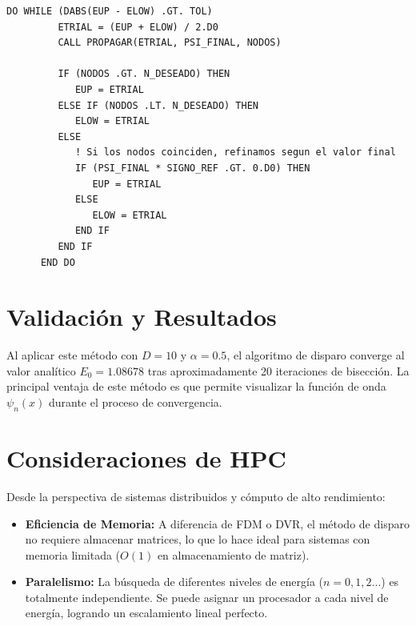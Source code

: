 \documentclass[12pt,a4paper]{article}
\begin{document}
\begin{lstlisting}[caption={Bucle de bisección para encontrar el autovalor E}]
      DO WHILE (DABS(EUP - ELOW) .GT. TOL)
         ETRIAL = (EUP + ELOW) / 2.D0
         CALL PROPAGAR(ETRIAL, PSI_FINAL, NODOS)
         
         IF (NODOS .GT. N_DESEADO) THEN
            EUP = ETRIAL
         ELSE IF (NODOS .LT. N_DESEADO) THEN
            ELOW = ETRIAL
         ELSE
            ! Si los nodos coinciden, refinamos segun el valor final
            IF (PSI_FINAL * SIGNO_REF .GT. 0.D0) THEN
               EUP = ETRIAL
            ELSE
               ELOW = ETRIAL
            END IF
         END IF
      END DO
\end{lstlisting}

\section{Validación y Resultados}
Al aplicar este método con $D=10$ y $\alpha=0.5$, el algoritmo de disparo converge al valor analítico $E_0 = 1.08678$ tras aproximadamente 20 iteraciones de bisección. La principal ventaja de este método es que permite visualizar la función de onda $\psi_n(x)$ durante el proceso de convergencia.

\section{Consideraciones de HPC}
Desde la perspectiva de sistemas distribuidos y cómputo de alto rendimiento:
\begin{itemize}
    \item \textbf{Eficiencia de Memoria:} A diferencia de FDM o DVR, el método de disparo no requiere almacenar matrices, lo que lo hace ideal para sistemas con memoria limitada ($O(1)$ en almacenamiento de matriz).
    \item \textbf{Paralelismo:} La búsqueda de diferentes niveles de energía ($n=0, 1, 2...$) es totalmente independiente. Se puede asignar un procesador a cada nivel de energía, logrando un escalamiento lineal perfecto.
\end{itemize}
\end{document}
